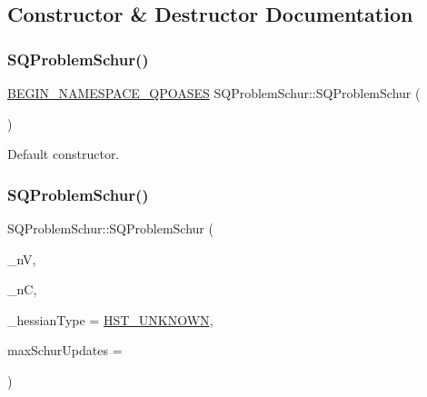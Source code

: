 \subsection{Constructor \& Destructor Documentation}
\mbox{\label{class_s_q_problem_schur_af90b7e84688b01f9e7eafb1b442ce8da}} 
\subsubsection{\texorpdfstring{S\+Q\+Problem\+Schur()}{SQProblemSchur()}\hspace{0.1cm}{\footnotesize\ttfamily [1/3]}}
{\footnotesize\ttfamily \hyperlink{_types_8hpp_afd127fcb3c8f47975e9fa0ec2bacde52}{B\+E\+G\+I\+N\+\_\+\+N\+A\+M\+E\+S\+P\+A\+C\+E\+\_\+\+Q\+P\+O\+A\+S\+ES} S\+Q\+Problem\+Schur\+::\+S\+Q\+Problem\+Schur (\begin{DoxyParamCaption}{ }\end{DoxyParamCaption})}

Default constructor. \mbox{\label{class_s_q_problem_schur_af9e29aabfa450e256b3e67fb8b441b3d}} 
\subsubsection{\texorpdfstring{S\+Q\+Problem\+Schur()}{SQProblemSchur()}\hspace{0.1cm}{\footnotesize\ttfamily [2/3]}}
{\footnotesize\ttfamily S\+Q\+Problem\+Schur\+::\+S\+Q\+Problem\+Schur (\begin{DoxyParamCaption}\item[{\hyperlink{_types_8hpp_ab6fd6105e64ed14a0c9281326f05e623}{int\+\_\+t}}]{\+\_\+nV,  }\item[{\hyperlink{_types_8hpp_ab6fd6105e64ed14a0c9281326f05e623}{int\+\_\+t}}]{\+\_\+nC,  }\item[{\hyperlink{_types_8hpp_a604cad5cda14e378ce4a77ab28ee9fd9}{Hessian\+Type}}]{\+\_\+hessian\+Type = {\ttfamily \hyperlink{_types_8hpp_a604cad5cda14e378ce4a77ab28ee9fd9a3479cf4e632ae731d4da9bf57a9f8907}{H\+S\+T\+\_\+\+U\+N\+K\+N\+O\+WN}},  }\item[{\hyperlink{_types_8hpp_ab6fd6105e64ed14a0c9281326f05e623}{int\+\_\+t}}]{max\+Schur\+Updates = {} }\end{DoxyParamCaption})}

